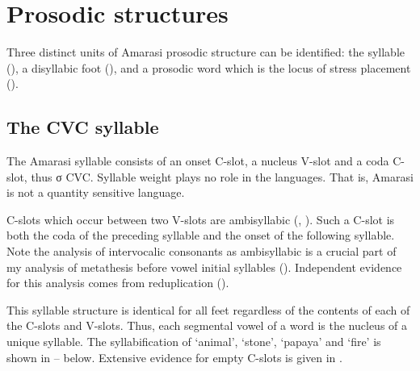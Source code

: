 \section{Prosodic structures}\label{sec:ProsStr}
Three distinct units of Amarasi prosodic structure
can be identified: the syllable (),
a disyllabic foot (),
and a prosodic word which is the locus of stress placement ().

\subsection{The CVC syllable}\label{sec:Syl}
The Amarasi syllable consists of an onset C-slot, a nucleus V-slot
and a coda C-slot, thus σ {\ra} CVC.
Syllable weight plays no role in the languages.
That is, Amarasi is not a quantity sensitive language.

C-slots which occur between two V-slots are ambisyllabic
(\citealp[36]{clke83}, \citealp[217ff]{du90}).
Such a C-slot is both the coda of the preceding syllable
and the onset of the following syllable.
Note the analysis of intervocalic consonants as
ambisyllabic is a crucial part of my analysis of
metathesis before vowel initial syllables ().
Independent evidence for this analysis comes from reduplication ().

This syllable structure is identical for all feet regardless
of the contents of each of the C-slots and V-slots.
Thus, each segmental vowel of a word is the nucleus of a unique syllable.
The syllabification of  `animal',  `stone',  `papaya' and  `fire'
is shown in -- below.
Extensive evidence for empty C-slots is given in .

